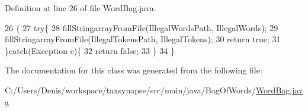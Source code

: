 Definition at line 26 of file Word\+Bag.\+java.


\begin{DoxyCode}
26                                                                               \{
27         \textcolor{keywordflow}{try}\{
28             fillStringarrayFromFile(IllegalWordsPath, IllegalWords);
29             fillStringarrayFromFile(IllegalTokensPath, IllegalTokens);
30             \textcolor{keywordflow}{return} \textcolor{keyword}{true};
31         \}\textcolor{keywordflow}{catch}(Exception e)\{
32             \textcolor{keywordflow}{return} \textcolor{keyword}{false};
33         \}
34     \}
\end{DoxyCode}


The documentation for this class was generated from the following file\+:\begin{DoxyCompactItemize}
\item 
C\+:/\+Users/\+Denis/workspace/taxsynapse/src/main/java/\+Bag\+Of\+Words/\hyperlink{_word_bag_8java}{Word\+Bag.\+java}\end{DoxyCompactItemize}
